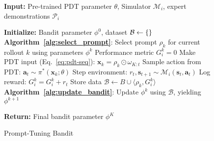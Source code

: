 \documentclass{article} %
\begin{document}


\begin{figure}[t]
        \begin{algorithm}[H]
            \caption{Prompt-Tuning Bandit}\label{alg:bandit_steps}
            \begin{algorithmic}[1]
                \item[] \textbf{Input:} Pre-trained PDT parameter $\theta$, Simulator $\mathcal{M}_i$, expert demonstrations $\mathcal{P}_i$
                \item[] \textbf{Initialize:} Bandit parameter $\phi^0$, dataset $\mathcal{B} \leftarrow \empty \{ \}$
                    \STATE \textbf{Algorithm~\ref{alg:select_prompt}}: Select prompt $\rho_k$ for current rollout $k$ using parameters $\phi^k$
                    \STATE Performance metric $G_i^k = 0$
                        \STATE Make PDT input (Eq.~\ref{eq:pdt-seq}): $\mathbf{x}_k = \rho_k \odot \omega_{K:t}$
                        \STATE Sample action from PDT: $\mathbf{a}_t \sim \pi^*(\mathbf{x}_k; \theta)$
                        \STATE Step environment: $r_t, \mathbf{s}_{t+1} \sim \mathcal{M}_i (\mathbf{s}_t, \mathbf{a}_t)$
                        \STATE Log reward: $G_i^k = G_i^k + r_t$
                    \ENDFOR
                    \STATE Store data $\mathcal{B} \leftarrow B \cup \langle \rho_k, G_i^k \rangle$
                    \STATE \textbf{Algorithm~\ref{alg:update_bandit}}: Update $\phi^k$ using $\mathcal{B}$, yielding $\phi^{k+1}$
                \ENDFOR
                \item[] \textbf{Return:} Final bandit parameter $\phi^K$
            \end{algorithmic}
        \end{algorithm}
\end{figure}
\end{document}
